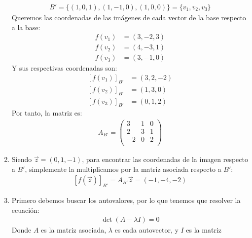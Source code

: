 \documentclass{article}
\begin{document}
\begin{enumerate}[label={(\alph*)}]
	\begin{equation}
		\begin{split}
			B' = \{ (1,0,1),(1,-1,0),(1,0,0) \} = \{ v_1,v_2,v_3 \}
		\end{split}
	\end{equation}
	Queremos las coordenadas de las imágenes de cada vector de la base respecto a la base:
	\begin{equation}
		\begin{split}
			f(v_1)&=(3,-2,3)\\f(v_2)&=(4,-3,1)\\f(v_3)&=(3,-1,0)
		\end{split}
	\end{equation}
	Y sus respectivas coordenadas son:
	\begin{equation}
		\begin{split}
			[f(v_1)]_{B'} &= (3,2,-2)\\
			[f(v_2)]_{B'} &= (1,3,0)\\
			[f(v_3)]_{B'} &= (0,1,2)
		\end{split}
	\end{equation}
	Por tanto, la matriz es:
		\begin{equation}
			\begin{split}
				A_{B'}=\begin{pmatrix}
3 & 1 & 0 \\
2 & 3 & 1 \\
-2 & 0 & 2 \\
\end{pmatrix}
			\end{split}
		\end{equation}
	\item Siendo \(\vec{z}=(0,1,-1)\), para encontrar las coordenadas de la imagen respecto a
		\(B'\), simplemente la multiplicamos por la matriz asociada respecto a \(B'\):
		\begin{equation}
			\begin{split}
				[f(\vec{z})]_{B'} = A_{B'} \vec{z}=(-1,-4,-2)
			\end{split}
		\end{equation}
	\item Primero debemos buscar los autovalores, por lo que tenemos que resolver la ecuación:
		\begin{equation}
			\begin{split}
				\det (A-\lambda I)= 0
			\end{split}
		\end{equation}
		Donde \(A\) es la matriz asociada, \(\lambda\) es cada autovector, y \(I\) es la matriz

\end{enumerate}
\end{document}
